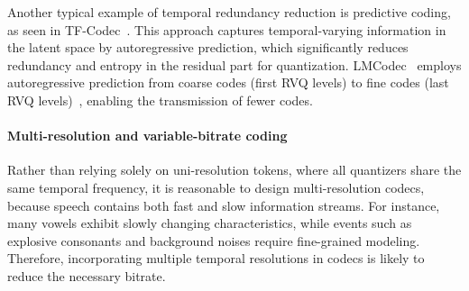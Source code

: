 
Another typical example of temporal redundancy reduction is predictive coding, as seen in TF-Codec~\cite{jiang2023latent}.
This approach captures temporal-varying information in the latent space by autoregressive prediction, which significantly reduces redundancy and entropy in the residual part for  quantization.
LMCodec~\cite{LMCodec} employs autoregressive prediction from coarse codes (first RVQ levels) to fine codes (last RVQ levels)~\cite{borsos2023audiolm}, enabling the transmission of fewer codes.

\paragraph{Multi-resolution and variable-bitrate coding}
\label{sec:multi-resolution}

Rather than relying solely on uni-resolution tokens, where all quantizers share the same temporal frequency, it is reasonable to design multi-resolution codecs, because speech contains both fast and slow information streams.
For instance, many vowels exhibit slowly changing characteristics, while events such as explosive consonants and background noises require fine-grained modeling. Therefore, incorporating multiple temporal resolutions in codecs is likely to reduce the necessary bitrate.


